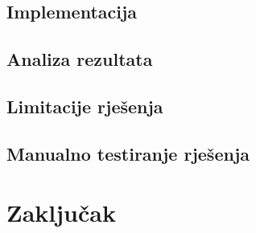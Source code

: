 \documentclass{foi}
\begin{document}
\section{Implementacija}
\section{Analiza rezultata}
\section{Limitacije rješenja}
\section{Manualno testiranje rješenja}
\chapter{Zaključak}

\printbibliography[title=Popis literature]

\listoffigures
{}
 
\listoftables
{}

\appendix
\renewcommand{\thechapter}{\arabic{chapter}}
\end{document}
